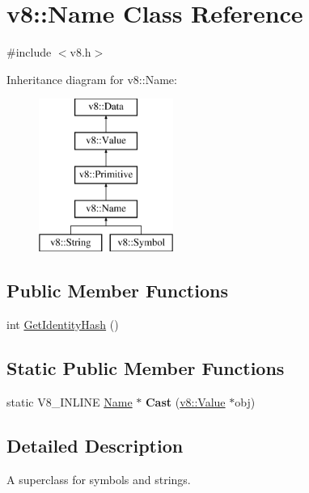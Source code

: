 \hypertarget{classv8_1_1_name}{}\section{v8\+:\+:Name Class Reference}
\label{classv8_1_1_name}


{\ttfamily \#include $<$v8.\+h$>$}

Inheritance diagram for v8\+:\+:Name\+:\begin{figure}[H]
\begin{center}
\leavevmode
\includegraphics[height=5.000000cm]{classv8_1_1_name}
\end{center}
\end{figure}
\subsection*{Public Member Functions}
\begin{DoxyCompactItemize}
\item 
int \hyperlink{classv8_1_1_name_aef60fce47685fad12914304f6bc52bf2}{Get\+Identity\+Hash} ()
\end{DoxyCompactItemize}
\subsection*{Static Public Member Functions}
\begin{DoxyCompactItemize}
\item 
\hypertarget{classv8_1_1_name_a8291aa8958f5dfb67d4415510f584ac4}{}static V8\+\_\+\+I\+N\+L\+I\+N\+E \hyperlink{classv8_1_1_name}{Name} $\ast$ {\bfseries Cast} (\hyperlink{classv8_1_1_value}{v8\+::\+Value} $\ast$obj)\label{classv8_1_1_name_a8291aa8958f5dfb67d4415510f584ac4}

\end{DoxyCompactItemize}


\subsection{Detailed Description}
A superclass for symbols and strings. 

